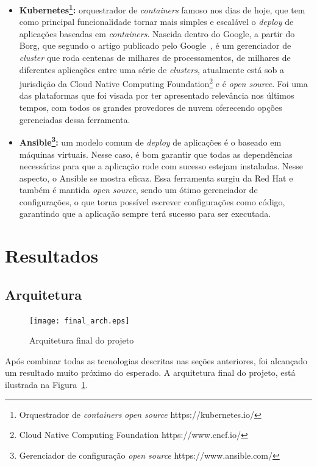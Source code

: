 \documentclass[11pt,twoside]{article}
\begin{document}
\begin{itemize}
  \item \textbf{Kubernetes\footnote{Orquestrador de \emph{containers} \emph{open source} https://kubernetes.io/}:} orquestrador de \emph{containers} famoso nos dias de hoje, que tem como principal funcionalidade tornar mais simples e escalável o \emph{deploy}
  de aplicações baseadas em \emph{containers}. Nascida dentro do Google, a partir do Borg, que segundo o artigo publicado pelo Google~\cite{BORG}, é um gerenciador de \emph{cluster} que roda centenas de milhares de processamentos,
  de milhares de diferentes aplicações entre uma série de \emph{clusters},
  atualmente está sob a jurisdição da Cloud Native Computing Foundation\footnote{Cloud Native Computing Foundation https://www.cncf.io/} e é \emph{open source}. Foi uma
  das plataformas que foi visada por ter apresentado relevância nos últimos tempos, com todos os grandes provedores de nuvem oferecendo opções gerenciadas dessa 
  ferramenta.
  \item \textbf{Ansible\footnote{Gerenciador de configuração \emph{open source} https://www.ansible.com/}:} um modelo comum de \emph{deploy} de aplicações é o baseado em máquinas virtuais. Nesse caso, é bom garantir que todas as dependências necessárias para que a 
  aplicação rode com sucesso estejam instaladas. Nesse aspecto, o Ansible se mostra eficaz. Essa ferramenta surgiu da Red Hat e também é mantida \emph{open source}, sendo um
  ótimo gerenciador de configurações, o que torna possível escrever configurações como código, garantindo que a aplicação sempre terá sucesso para ser executada.
\end{itemize}

\section{Resultados}

\subsection{Arquitetura}

\begin{figure}[!h]
  \centering
  \texttt{[image: final\_arch.eps]}
  \caption{Arquitetura final do projeto}
  \label{fig:finalArch}
\end{figure}

Após combinar todas as tecnologias descritas nas seções anteriores, foi alcançado um resultado muito próximo do esperado. A arquitetura final do projeto, está ilustrada na Figura~\ref{fig:finalArch}.
\end{document}
